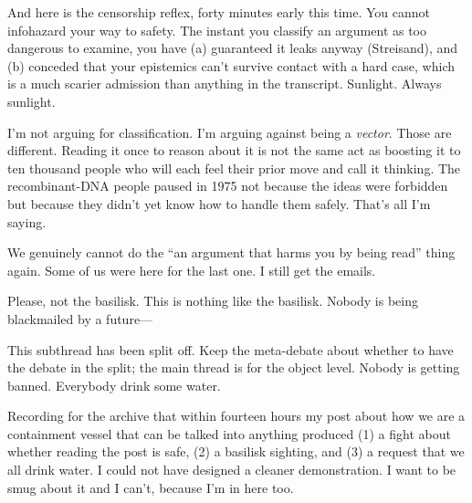 \begin{wtbthread}

And here is the censorship reflex, forty minutes early this time. You cannot infohazard your way to safety. The instant you classify an argument as too dangerous to examine, you have (a) guaranteed it leaks anyway (Streisand), and (b) conceded that your epistemics can't survive contact with a hard case, which is a much scarier admission than anything in the transcript. Sunlight. Always sunlight.

\begin{wtbthread}

I'm not arguing for classification. I'm arguing against being a \emph{vector}. Those are different. Reading it once to reason about it is not the same act as boosting it to ten thousand people who will each feel their prior move and call it thinking. The recombinant-DNA people paused in 1975 not because the ideas were forbidden but because they didn't yet know how to handle them safely. That's all I'm saying.

\begin{wtbthread}

We genuinely cannot do the ``an argument that harms you by being read'' thing again. Some of us were here for the last one. I still get the emails.

\begin{wtbthread}

Please, not the basilisk. This is nothing like the basilisk. Nobody is being blackmailed by a future---

\begin{wtbthread}
\end{wtbthread}

\begin{wtbthread}

This subthread has been split off. Keep the meta-debate about whether to have the debate in the split; the main thread is for the object level. Nobody is getting banned. Everybody drink some water.

\begin{wtbthread}

Recording for the archive that within fourteen hours my post about how we are a containment vessel that can be talked into anything produced (1) a fight about whether reading the post is safe, (2) a basilisk sighting, and (3) a request that we all drink water. I could not have designed a cleaner demonstration. I want to be smug about it and I can't, because I'm in here too.
\end{wtbthread}
\end{wtbthread}
\end{wtbthread}
\end{wtbthread}
\end{wtbthread}
\end{wtbthread}

